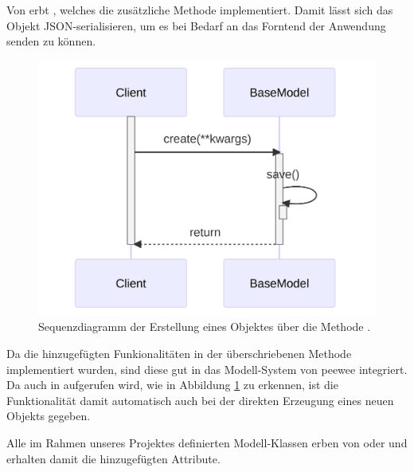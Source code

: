 Von  erbt , welches die zusätzliche Methode  implementiert. Damit lässt sich das Objekt JSON-serialisieren, um es bei Bedarf an das Forntend der Anwendung senden zu können.

\begin{figure}[htb]
	\centering
	\includegraphics[width=0.75\linewidth]{images/diagrams/database-seq.png}
	\caption{Sequenzdiagramm der Erstellung eines Objektes über die Methode .}
	\label{fig:database-seq}
\end{figure}

Da die hinzugefügten Funkionalitäten in der überschriebenen Methode  implementiert wurden, sind diese gut in das Modell-System von peewee integriert. Da  auch in  aufgerufen wird, wie in Abbildung \ref{fig:database-seq} zu erkennen, ist die Funktionalität damit automatisch auch bei der direkten Erzeugung eines neuen Objekts gegeben.

Alle im Rahmen unseres Projektes definierten Modell-Klassen erben von  oder  und erhalten damit die hinzugefügten Attribute.